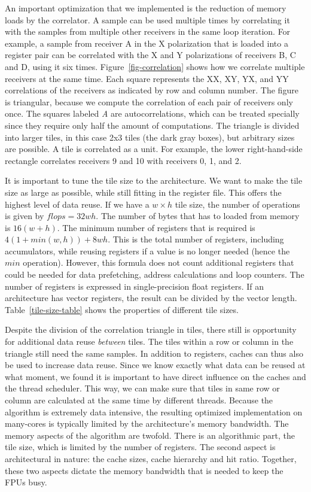 \documentclass{article}
\begin{document}
An important optimization that we implemented is the reduction
of memory loads by the correlator. 
A sample can be used multiple times by correlating it
with the samples from multiple other receivers in the same loop iteration.
For example, a sample from receiver A in the X polarization
that is loaded into a register pair can be correlated with the X and
Y polarizations of receivers B, C and D, using it six times. 
Figure~\ref{fig-correlation} shows how we correlate multiple
receivers at the same time. Each square represents the XX, XY,
YX, and YY correlations of the receivers as indicated by row and
column number. The figure is triangular, because we compute
the correlation of each pair of receivers only once. The squares labeled \emph{A} are
autocorrelations, which can be treated specially since they require only half
the amount of computations.
The triangle is divided into larger tiles, in this case 
2x3 tiles (the dark gray boxes), but arbitrary sizes are possible.
A tile is correlated as a unit. For example, the lower
right-hand-side rectangle correlates receivers 9 and 10 with receivers
0, 1, and 2.

It is important to tune the tile size to the architecture. We want to
make the tile size as large as possible, while still fitting in the
register file. This offers the highest level of data reuse.  
If we have a $w \times h$ tile size, the number of operations is given by $flops = 32wh$.
The number of bytes that has to loaded from memory is $16(w+h)$.
The minimum number of registers that is required is $4 (1 + min(w,h)) + 8 w h$.
This is the total number of registers, including accumulators, while reusing
registers if a value is no longer needed (hence the $min$ operation). However,
this formula does not count additional registers that could be needed for data prefetching,
address calculations and loop counters.
The number of registers is expressed in single-precision float registers. If an architecture has vector
registers, the result can be divided by the vector length.
Table~\ref{tile-size-table} shows the properties of different tile sizes. 

Despite the division of the correlation triangle in tiles, there
still is opportunity for additional data reuse \emph{between} tiles. 
The tiles
within a row or column in the triangle still need the same samples.
In
addition to registers, caches can thus also be used to increase data
reuse.  Since we know exactly what data can be reused at what moment, we
found it is important to have direct influence on the caches and the thread scheduler.  This
way, we can make sure that tiles in same row or column are calculated
at the same time by different threads. 
Because the algorithm is
extremely data intensive, the resulting optimized implementation on
many-cores is typically limited by the architecture's memory
bandwidth. The memory aspects of the algorithm are twofold.
There is an algorithmic part, the tile size, which is limited
by the number of registers. The second aspect is architectural in nature: the cache
sizes, cache hierarchy and hit ratio. Together, these two aspects dictate the
memory bandwidth that is needed to keep the FPUs busy.
\end{document}
